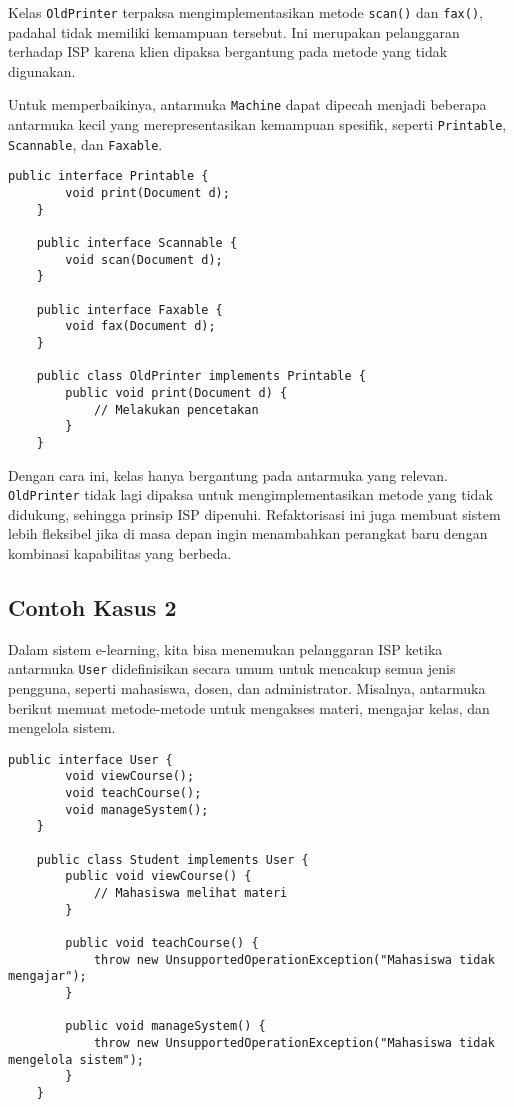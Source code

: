 Kelas \texttt{OldPrinter} terpaksa mengimplementasikan metode \texttt{scan()} dan \texttt{fax()}, padahal tidak memiliki kemampuan tersebut. Ini merupakan pelanggaran terhadap ISP karena klien dipaksa bergantung pada metode yang tidak digunakan.

Untuk memperbaikinya, antarmuka \texttt{Machine} dapat dipecah menjadi beberapa antarmuka kecil yang merepresentasikan kemampuan spesifik, seperti \texttt{Printable}, \texttt{Scannable}, dan \texttt{Faxable}.

\begin{lstlisting}[style=JavaStyle, caption={Refaktor menggunakan ISP}]
	public interface Printable {
		void print(Document d);
	}
	
	public interface Scannable {
		void scan(Document d);
	}
	
	public interface Faxable {
		void fax(Document d);
	}
	
	public class OldPrinter implements Printable {
		public void print(Document d) {
			// Melakukan pencetakan
		}
	}
\end{lstlisting}

Dengan cara ini, kelas hanya bergantung pada antarmuka yang relevan. \texttt{OldPrinter} tidak lagi dipaksa untuk mengimplementasikan metode yang tidak didukung, sehingga prinsip ISP dipenuhi. Refaktorisasi ini juga membuat sistem lebih fleksibel jika di masa depan ingin menambahkan perangkat baru dengan kombinasi kapabilitas yang berbeda.

\subsection{Contoh Kasus 2}
Dalam sistem e-learning, kita bisa menemukan pelanggaran ISP ketika antarmuka \texttt{User} didefinisikan secara umum untuk mencakup semua jenis pengguna, seperti mahasiswa, dosen, dan administrator. Misalnya, antarmuka berikut memuat metode-metode untuk mengakses materi, mengajar kelas, dan mengelola sistem.

\begin{lstlisting}[style=JavaStyle, caption={Contoh pelanggaran ISP}]
	public interface User {
		void viewCourse();
		void teachCourse();
		void manageSystem();
	}
	
	public class Student implements User {
		public void viewCourse() {
			// Mahasiswa melihat materi
		}
		
		public void teachCourse() {
			throw new UnsupportedOperationException("Mahasiswa tidak mengajar");
		}
		
		public void manageSystem() {
			throw new UnsupportedOperationException("Mahasiswa tidak mengelola sistem");
		}
	}
\end{lstlisting}

